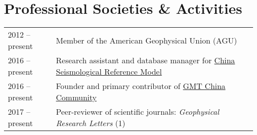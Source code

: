 \section*{Professional Societies \& Activities}

\begin{tabular}{ll}
2012 -- present & Member of the American Geophysical Union (AGU) \\
2016 -- present & Research assistant and database manager for \href{http://chinageorefmodel.org/}{China Seismological Reference Model} \\
2016 -- present & Founder and primary contributor of \href{http://gmt-china.org/}{GMT China Community} \\
2017 -- present & Peer-reviewer of scientific journals: \textit{Geophysical Research Letters} (1) \\
\end{tabular}
